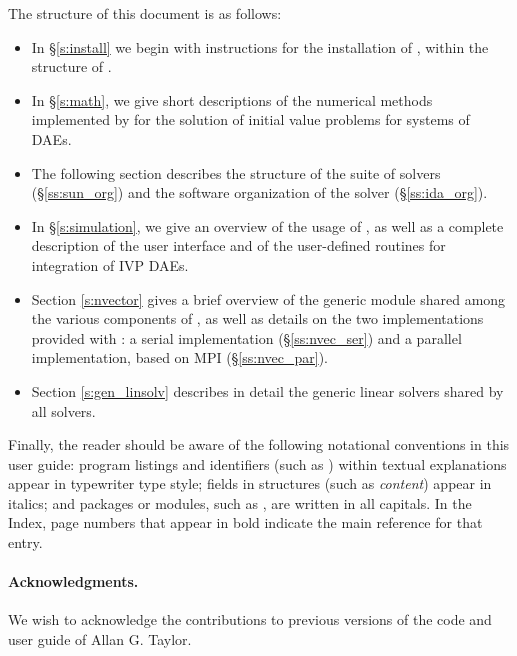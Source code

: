 The structure of this document is as follows:
\begin{itemize}
\item
  In \S\ref{s:install} we begin with instructions for the installation of 
  {\ida}, within the structure of {\sundials}.
\item
  In \S\ref{s:math}, we give short descriptions of the numerical 
  methods implemented by {\ida} for the solution of initial value problems
  for systems of DAEs.
\item
  The following section describes the structure of the {\sundials} suite
  of solvers (\S\ref{ss:sun_org}) and the software organization of the {\ida}
  solver (\S\ref{ss:ida_org}). 
\item
  In \S\ref{s:simulation}, we give an overview of the usage of {\ida},
  as well as a complete description of the user interface and of the 
  user-defined routines for integration of IVP DAEs.
\item
  Section \ref{s:nvector} gives a brief overview of the generic {\nvector} module 
  shared among the various components of {\sundials}, as well as details on the two {\nvector}
  implementations provided with {\sundials}: a serial implementation
  (\S\ref{ss:nvec_ser}) and a parallel implementation, based on MPI
  (\S\ref{ss:nvec_par}).
\item
  Section \ref{s:gen_linsolv} describes in detail the generic linear solvers shared 
  by all {\sundials} solvers.
\end{itemize}

Finally, the reader should be aware of the following notational conventions
in this user guide:  program listings and identifiers (such as ) 
within textual explanations appear in typewriter type style; 
fields in {\C} structures (such as {\em content}) appear in italics;
and packages or modules, such as {\cvdense}, are written in all capitals. 
In the Index, page numbers that appear in bold indicate the main reference
for that entry.

\paragraph{Acknowledgments.}
We wish to acknowledge the contributions to previous versions of the
{\ida} code and user guide of Allan G. Taylor.

